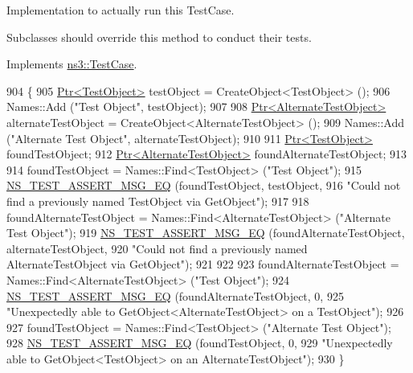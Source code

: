 Implementation to actually run this Test\+Case. 

Subclasses should override this method to conduct their tests. 

Implements \hyperlink{classns3_1_1TestCase_a8ff74680cf017ed42011e4be51917a24}{ns3\+::\+Test\+Case}.


\begin{DoxyCode}
904 \{
905   \hyperlink{classns3_1_1Ptr}{Ptr<TestObject>} testObject = CreateObject<TestObject> ();
906   Names::Add (\textcolor{stringliteral}{"Test Object"}, testObject);
907 
908   \hyperlink{classns3_1_1Ptr}{Ptr<AlternateTestObject>} alternateTestObject = CreateObject<AlternateTestObject> 
      ();
909   Names::Add (\textcolor{stringliteral}{"Alternate Test Object"}, alternateTestObject);
910 
911   \hyperlink{classns3_1_1Ptr}{Ptr<TestObject>} foundTestObject;
912   \hyperlink{classns3_1_1Ptr}{Ptr<AlternateTestObject>} foundAlternateTestObject;
913 
914   foundTestObject = Names::Find<TestObject> (\textcolor{stringliteral}{"Test Object"});
915   \hyperlink{group__testing_ga2a9d78cffb3db8e867c35fff0b698cf5}{NS\_TEST\_ASSERT\_MSG\_EQ} (foundTestObject, testObject, 
916                          \textcolor{stringliteral}{"Could not find a previously named TestObject via GetObject"});
917 
918   foundAlternateTestObject = Names::Find<AlternateTestObject> (\textcolor{stringliteral}{"Alternate Test Object"});
919   \hyperlink{group__testing_ga2a9d78cffb3db8e867c35fff0b698cf5}{NS\_TEST\_ASSERT\_MSG\_EQ} (foundAlternateTestObject, alternateTestObject, 
920                          \textcolor{stringliteral}{"Could not find a previously named AlternateTestObject via GetObject"});
921 
922 
923   foundAlternateTestObject = Names::Find<AlternateTestObject> (\textcolor{stringliteral}{"Test Object"});
924   \hyperlink{group__testing_ga2a9d78cffb3db8e867c35fff0b698cf5}{NS\_TEST\_ASSERT\_MSG\_EQ} (foundAlternateTestObject, 0, 
925                          \textcolor{stringliteral}{"Unexpectedly able to GetObject<AlternateTestObject> on a TestObject"});
926 
927   foundTestObject = Names::Find<TestObject> (\textcolor{stringliteral}{"Alternate Test Object"});
928   \hyperlink{group__testing_ga2a9d78cffb3db8e867c35fff0b698cf5}{NS\_TEST\_ASSERT\_MSG\_EQ} (foundTestObject, 0, 
929                          \textcolor{stringliteral}{"Unexpectedly able to GetObject<TestObject> on an AlternateTestObject"});
930 \}
\end{DoxyCode}

